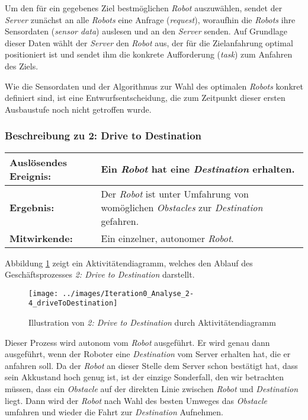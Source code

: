 			Um den für ein gegebenes Ziel bestmöglichen \emph{Robot} auszuwählen, sendet
			der \emph{Server} zunächst an alle \emph{Robots} eine Anfrage (\emph{request}),
			woraufhin die \emph{Robots} ihre Sensordaten (\emph{sensor data}) auslesen und
			an den \emph{Server} senden. Auf Grundlage dieser Daten wählt der \emph{Server} den
			\emph{Robot} aus, der für die Zielanfahrung optimal positioniert ist und
			sendet ihm die konkrete Aufforderung (\emph{task}) zum Anfahren des
			Ziels.

			Wie die Sensordaten und der Algorithmus zur Wahl des optimalen \emph{Robots}
			konkret definiert sind, ist eine Entwurfsentscheidung, die zum Zeitpunkt
			dieser ersten Ausbaustufe noch nicht getroffen wurde.

			\subsubsection*{Beschreibung zu 2: Drive to Destination}

			\begin{table}[H]
				\centering
				\begin{tabularx}{\textwidth}{@{}p{3cm}X@{}}
				\toprule
				\textbf{Auslösendes Ereignis:} & Ein \emph{Robot} hat eine \emph{Destination} erhalten.\\ \midrule
				\textbf{Ergebnis:} & Der \emph{Robot} ist unter Umfahrung von womöglichen \emph{Obstacles} zur \emph{Destination} gefahren.\\ \midrule
				\textbf{Mitwirkende:} &	Ein einzelner, autonomer \emph{Robot}. \\
				\bottomrule
				\end{tabularx}
				\label{tab:2-4-drive-to-destination}
			\end{table}

			Abbildung \ref{fig:2-4-drive-to-destination-aktivitaetendiagramm} zeigt ein Aktivitätendiagramm, welches den Ablauf des Geschäftsprozesses \emph{2: Drive to Destination} darstellt.

			\begin{figure}[H]
				\centering
				\texttt{[image: ../images/Iteration0\_Analyse\_2-4\_driveToDestination]}
				\caption{Illustration von \emph{2: Drive to Destination} durch Aktivitätendiagramm}
				\label{fig:2-4-drive-to-destination-aktivitaetendiagramm}
			\end{figure}

			Dieser Prozess wird autonom vom \emph{Robot} ausgeführt. Er wird genau
			dann ausgeführt, wenn der Roboter eine \emph{Destination} vom Server
			erhalten hat, die er anfahren soll. Da der \emph{Robot} an dieser Stelle
			dem Server schon bestätigt hat, dass sein Akkustand hoch genug ist, ist
			der einzige Sonderfall, den wir betrachten müssen, dass ein
			\emph{Obstacle} auf der direkten Linie zwischen \emph{Robot} und
			\emph{Destination} liegt. Dann wird der \emph{Robot} nach Wahl des
			besten Umweges das \emph{Obstacle} umfahren und wieder die Fahrt zur
			\emph{Destination} Aufnehmen.



